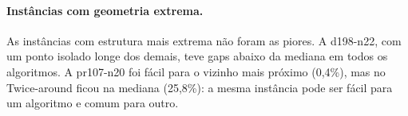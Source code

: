 \paragraph{Instâncias com geometria extrema.} As instâncias com estrutura mais extrema
não foram as piores. A d198-n22, com um ponto isolado longe dos demais, teve gaps abaixo
da mediana em todos os algoritmos. A pr107-n20 foi fácil para o vizinho mais próximo
(0,4\%), mas no Twice-around ficou na mediana (25,8\%): a mesma instância pode ser fácil
para um algoritmo e comum para outro.
